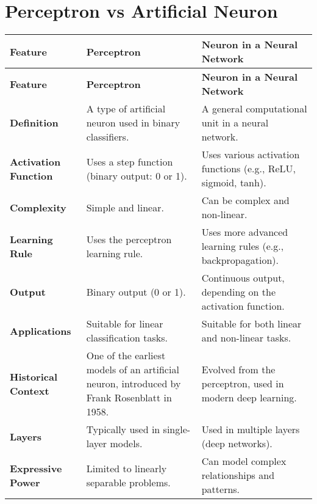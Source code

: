 
\section{Perceptron vs Artificial Neuron \cite{chatgpt}}\label{Perceptron vs Artificial Neuron}

\begin{longtable}{| m{3cm} | m{6cm} | m{6cm} |}
    
    \hline
    \textbf{Feature} & \textbf{Perceptron} & \textbf{Neuron in a Neural Network} \\
    \hline
    \endfirsthead
    
    \hline
    \textbf{Feature} & \textbf{Perceptron} & \textbf{Neuron in a Neural Network} \\
    \hline
    \endhead
    
    \hline
    \endfoot
    
    \hline
    \endlastfoot
    
    \textbf{Definition} & A type of artificial neuron used in binary classifiers. & A general computational unit in a neural network. \\
    \hline
    
    \textbf{Activation Function} & Uses a step function (binary output: 0 or 1). & Uses various activation functions (e.g., ReLU, sigmoid, tanh). \\
    \hline
    
    \textbf{Complexity} & Simple and linear. & Can be complex and non-linear. \\
    \hline
    
    \textbf{Learning Rule} & Uses the perceptron learning rule. & Uses more advanced learning rules (e.g., backpropagation). \\
    \hline
    
    \textbf{Output} & Binary output (0 or 1). & Continuous output, depending on the activation function. \\
    \hline
    
    \textbf{Applications} & Suitable for linear classification tasks. & Suitable for both linear and non-linear tasks. \\
    \hline
    
    \textbf{Historical Context} & One of the earliest models of an artificial neuron, introduced by Frank Rosenblatt in 1958. & Evolved from the perceptron, used in modern deep learning. \\
    \hline
    
    \textbf{Layers} & Typically used in single-layer models. & Used in multiple layers (deep networks). \\
    \hline

    \textbf{Expressive Power} & Limited to linearly separable problems. & Can model complex relationships and patterns. \\
    \hline

\end{longtable}

